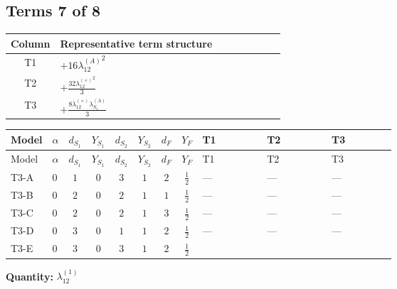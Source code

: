 \documentclass[8pt]{article}
\begin{document}
\begin{landscape}
\subsection*{Terms 7 of 8}
\begin{center}
\begin{tabular}{@{}c >{\raggedright\arraybackslash}p{0.82\linewidth}@{}}
\toprule
Column & Representative term structure \\
\midrule
T1 & \(\displaystyle +16 {\lambda_{12}^{(A)}}^2\) \\
\midrule
T2 & \(\displaystyle +\frac{32 {\lambda_{12}^{(\times)}}^2}{3}\) \\
\midrule
T3 & \(\displaystyle +\frac{8 {\lambda_{12}^{(\times)}} {\lambda_{S_1}^{(A)}}}{3}\) \\
\midrule
\bottomrule
\end{tabular}
\end{center}
\smallskip
\tiny
\begin{longtable}{@{}llcccccc >{\raggedright\arraybackslash}p{0.21\linewidth} >{\raggedright\arraybackslash}p{0.21\linewidth} >{\raggedright\arraybackslash}p{0.21\linewidth}@{}}
\toprule
Model & $\alpha$ & $d_{S_1}$ & $Y_{S_1}$ & $d_{S_2}$ & $Y_{S_2}$ & $d_F$ & $Y_F$ & T1 & T2 & T3 \\
\midrule
\endfirsthead
\toprule
Model & $\alpha$ & $d_{S_1}$ & $Y_{S_1}$ & $d_{S_2}$ & $Y_{S_2}$ & $d_F$ & $Y_F$ & T1 & T2 & T3 \\
\midrule
\endhead
T3-A & $0$ & $1$ & $0$ & $3$ & $1$ & $2$ & $\frac{1}{2}$ & --- & --- & --- \\
\midrule
T3-B & $0$ & $2$ & $0$ & $2$ & $1$ & $1$ & $\frac{1}{2}$ & --- & --- & --- \\
\midrule
T3-C & $0$ & $2$ & $0$ & $2$ & $1$ & $3$ & $\frac{1}{2}$ & --- & --- & --- \\
\midrule
T3-D & $0$ & $3$ & $0$ & $1$ & $1$ & $2$ & $\frac{1}{2}$ & --- & --- & --- \\
\midrule
T3-E & $0$ & $3$ & $0$ & $3$ & $1$ & $2$ & $\frac{1}{2}$ & \scriptsize\adjustbox{max width=\linewidth}{$\begin{gathered} +16 {\lambda_{12}^{(A)}}^2\end{gathered}$} & \scriptsize\adjustbox{max width=\linewidth}{$\begin{gathered} +\frac{32 {\lambda_{12}^{(\times)}}^2}{3}\end{gathered}$} & \scriptsize\adjustbox{max width=\linewidth}{$\begin{gathered} +\frac{8 {\lambda_{12}^{(\times)}} {\lambda_{S_1}^{(A)}}}{3}\end{gathered}$} \\
\midrule
\bottomrule
\end{longtable}
\clearpage
\noindent\textbf{Quantity: }$\lambda_{12}^{(1)}$\par\smallskip

\end{landscape}
\end{document}

